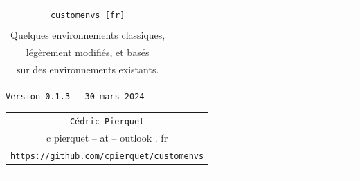 \documentclass[french,11pt,a4paper]{article}
\def\TPversion{0.1.3}
\def\TPdate{30 mars 2024}
\begin{document}
\pagestyle{fancy}

\thispagestyle{empty}

\begin{center}
	\begin{minipage}{0.75\linewidth}
	\begin{tcolorbox}[colframe=yellow,colback=yellow!15]
		\begin{center}
			\renewcommand\arraystretch{1.25}
			\begin{tabular}{c}
				{\Huge \texttt{customenvs [fr]}}\\
				\\
				{\Large Quelques environnements classiques,} \\
				{\Large légèrement modifiés, et basés} \\
				{\Large sur des environnements existants.} \\
			\end{tabular}
			\renewcommand\arraystretch{1}
			
			\medskip
			
			{\small \texttt{Version \TPversion{} -- \TPdate}}
		\end{center}
	\end{tcolorbox}
\end{minipage}
\end{center}

\vspace*{1mm}

\begin{center}
	\begin{tabular}{c}
	\texttt{Cédric Pierquet}\\
	{\ttfamily c pierquet -- at -- outlook . fr}\\
	\texttt{\url{https://github.com/cpierquet/customenvs}}
\end{tabular}
\end{center}

\vspace*{5mm}

%
%
%
%
%

\hrule


\hypertarget{matoc}{}
\end{document}
